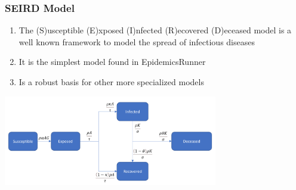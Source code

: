 \documentclass{beamer}
\begin{document}
\begin{frame}
	\frametitle{SEIRD Model}
	\begin{enumerate}[$\bullet$]
		\item The (S)usceptible (E)xposed (I)nfected (R)ecovered (D)eceased model is a well known framework to model the spread of infectious diseases		
		\item It is the simplest model found in EpidemicsRunner \\\vspace{0.1cm}
	       	
                \item Is a robust basis for other more specialized models	\\\vspace{0.3cm}

	\end{enumerate}
	\begin{center}
		\includegraphics[width=0.7\textwidth]{./images/SEIRD_flow.png}
	\end{center}
\end{frame}

 			


\end{document}
